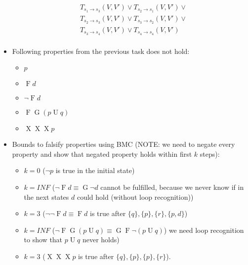 \documentclass[language=en,sheet=4,prefix]{exercise}
\newcommand{\U}{\ensuremath{\operatorname{U}}\xspace}
\newcommand{\X}{\ensuremath{\operatorname{X}}\xspace}
\newcommand{\G}{\ensuremath{\operatorname{G}}\xspace}
\newcommand{\F}{\ensuremath{\operatorname{F}}\xspace}
\begin{document}
\begin{solution}
\begin{itemize}
\begin{align*}
        & T_{s_1 \rightarrow s_3}(V, V') \vee T_{s_2 \rightarrow s_1}(V, V') \vee \\
        & T_{s_2 \rightarrow s_3}(V, V') \vee T_{s_3 \rightarrow s_2}(V, V') \vee \\
        & T_{s_3 \rightarrow s_4}(V, V') \vee T_{s_4 \rightarrow s_4}(V, V') \\
      \end{align*}
    \item Following properties from the previous task does not hold:
      \begin{itemize}
        \item $p$
        \item $\F d$       
        \item $¬\F d$
        \item $\F\G(p\U q)$
        \item $\X\X\X p$
      \end{itemize}
    \item Bounds to falsify properties using BMC (NOTE: we need to negate every property and show that negated property holds within first $k$ steps):
      \begin{itemize}
        \item $k = 0$ ($\neg p$ is true in the initial state) 
        \item $k = INF$ ($\neg \F d \equiv \G \neg d$ cannot be fulfilled, because we never know if in the next states $d$ could hold (without loop recognition))
        \item $k = 3$ ($\neg \neg \F d \equiv \F d$ is true after $\{q\},\{p\},\{r\},\{p,d\}$)
        \item $k = INF$ ($\neg\F\G(p \U q) \equiv \G\F \neg (p \U q)$) we need loop recognition to show that $p \U q$ never holds)
        \item $k = 3$ ($\X\X\X p$ is true after $\{q\},\{p\},\{p\},\{r\}$).
      \end{itemize}      
\end{itemize}
\end{solution}
\end{document}
